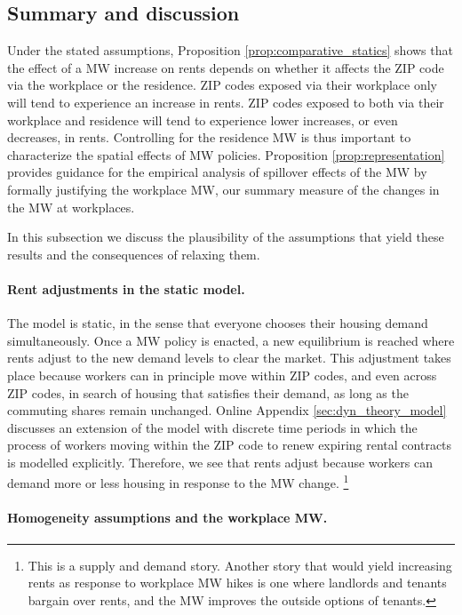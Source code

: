 \subsection{Summary and discussion}

Under the stated assumptions, Proposition \ref{prop:comparative_statics} shows 
that the effect of a MW increase on rents depends on whether it affects the 
ZIP code via the workplace or the residence.
ZIP codes exposed via their workplace only will tend to experience an 
increase in rents.
ZIP codes exposed to both via their workplace and residence will tend to 
experience lower increases, or even decreases, in rents.
Controlling for the residence MW is thus important to characterize the spatial 
effects of MW policies.
Proposition \ref{prop:representation} provides guidance for the empirical
analysis of spillover effects of the MW by formally justifying the 
workplace MW, our summary measure of the changes in the MW at workplaces.

In this subsection we discuss the plausibility of the assumptions that yield 
these results and the consequences of relaxing them.

\paragraph{Rent adjustments in the static model.}

The model is static, in the sense that everyone chooses their housing demand 
simultaneously.
Once a MW policy is enacted, a new equilibrium is reached where rents adjust
to the new demand levels to clear the market.
This adjustment takes place because workers can in principle move within ZIP 
codes, and even across ZIP codes, in search of housing that satisfies their 
demand, as long as the commuting shares remain unchanged.
Online Appendix \ref{sec:dyn_theory_model} discusses an extension of the model
with discrete time periods in which the process of workers moving within the 
ZIP code to renew expiring rental contracts is modelled explicitly.
Therefore, we see that rents adjust because workers can demand more or less 
housing in response to the MW change.%
\footnote{This is a supply and demand story. 
    Another story that would yield increasing rents as response to workplace MW
    hikes is one where landlords and tenants bargain over rents, 
    and the MW improves the outside options of tenants.}

\paragraph{Homogeneity assumptions and the workplace MW.}

